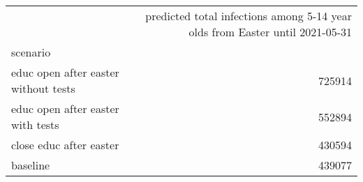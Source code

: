 \begin{tabular}{lr}
\toprule
{} &  predicted total infections among 5-14 year olds from Easter until 2021-05-31 \\
scenario                               &                                                                               \\
\midrule
 educ open after easter  without tests &                                             725914 \\
 educ open after easter  with tests    &                                             552894 \\
 close educ after easter               &                                             430594 \\
 baseline                              &                                             439077 \\
\bottomrule
\end{tabular}
